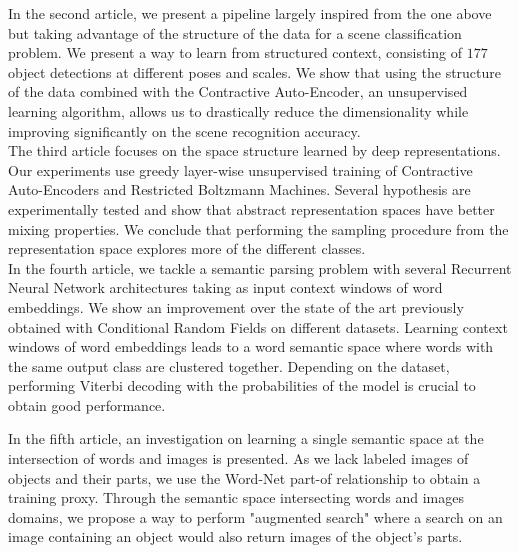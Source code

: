 In the second article, we present a pipeline largely inspired from the one above
but taking advantage of the structure of the data for a scene classification
problem. We present a way to learn from structured context, consisting of $177$
object detections at different poses and scales. We show that using the
structure of the data combined with the Contractive Auto-Encoder, an
unsupervised learning algorithm, 
allows us to drastically reduce the dimensionality while improving
significantly on the scene recognition accuracy. 
\\

\vspace{-0.2cm}
The third article focuses on the space structure learned by deep
representations. Our experiments use greedy layer-wise unsupervised training of
Contractive Auto-Encoders and Restricted Boltzmann Machines. Several hypothesis
are experimentally tested and show that abstract representation spaces have
better mixing properties. We conclude that performing the sampling procedure
from the representation space explores more of the different classes.
\\

\vspace{-0.2cm}
In the fourth article, we tackle a semantic parsing problem with several
Recurrent Neural Network architectures taking as input context windows of word
embeddings. We show an improvement over the state of the art previously
obtained with Conditional Random Fields on different datasets. Learning context
windows of word embeddings leads to a
word semantic space where words with the same output class are
clustered together. Depending on the dataset, performing Viterbi decoding with
the probabilities of the model is crucial to obtain good performance.

In the fifth article, an investigation on learning a single semantic space at
the intersection of words and images is presented. As we lack labeled images
of objects and their parts, we use the Word-Net part-of relationship to obtain
a training proxy. Through the semantic space intersecting words and images
domains, we propose a way to perform "augmented search" where a search on an
image containing an object would also return images of the object's parts.

